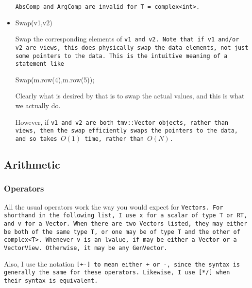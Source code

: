 \begin{itemize}
\tt{AbsComp} and \tt{ArgComp} are invalid for \tt{T = complex<int>}.

\item
\begin{tmvcode}
Swap(v1,v2)
\end{tmvcode}
Swap the corresponding elements of \tt{v1} and \tt{v2}.  Note that if v1 and/or v2 are
views, this does physically
swap the data elements, not just some pointers to the data.  This is the intuitive 
meaning of a statement like
\begin{tmvcode}
Swap(m.row(4),m.row(5));
\end{tmvcode}
Clearly what is desired by that is to swap the actual values, and this is what we actually do.

However, if \tt{v1} and \tt{v2} are both \tt{tmv::Vector} objects, rather than views, then the 
swap efficiently swaps the pointers to the data, and so takes $O(1)$ time, rather than
$O(N)$.

\end{itemize}

\subsection{Arithmetic}
\label{Vector_Arithmetic}

\subsubsection{Operators}

All the usual operators work the way you would expect for \tt{Vector}s.  For shorthand in the 
following list, I use \tt{x} for a scalar of type \tt{T} or \tt{RT}, and
\tt{v} for a \tt{Vector}.  When there are two \tt{Vector}s
listed, they may either be both of the same type \tt{T}, or one may be of type 
\tt{T} and the other of \tt{complex<T>}.  Whenever \tt{v} is an lvalue,
if may be either a \tt{Vector} or a \tt{VectorView}.  Otherwise, it may be any \tt{GenVector}.

Also, I use the notation \tt{[+-]} to mean either \tt{+} or \tt{-}, since
the syntax is generally the same for these operators.
Likewise, I use \tt{[*/]} when their syntax is equivalent.

